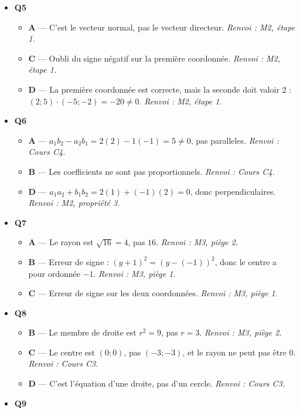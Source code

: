 \begin{itemize}
\begin{itemize}
  \end{itemize}
  \item \textbf{Q5}
  \begin{itemize}
    \item \textbf{A} — C'est le vecteur normal, pas le vecteur directeur. \emph{Renvoi : M2, étape 1.}
    \item \textbf{C} — Oubli du signe négatif sur la première coordonnée. \emph{Renvoi : M2, étape 1.}
    \item \textbf{D} — La première coordonnée est correcte, mais la seconde doit valoir $2$ : $(2;5)\cdot(-5;-2)=-20\neq0$. \emph{Renvoi : M2, étape 1.}
  \end{itemize}
  \item \textbf{Q6}
  \begin{itemize}
    \item \textbf{A} — $a_1 b_2 - a_2 b_1 = 2(2) - 1(-1) = 5 \neq 0$, pas paralleles. \emph{Renvoi : Cours C4.}
    \item \textbf{B} — Les coefficients ne sont pas proportionnels. \emph{Renvoi : Cours C4.}
    \item \textbf{D} — $a_1 a_2 + b_1 b_2 = 2(1) + (-1)(2) = 0$, donc perpendiculaires. \emph{Renvoi : M2, propriété 3.}
  \end{itemize}
  \item \textbf{Q7}
  \begin{itemize}
    \item \textbf{A} — Le rayon est $\sqrt{16} = 4$, pas $16$. \emph{Renvoi : M3, piège 2.}
    \item \textbf{B} — Erreur de signe : $(y + 1)^2 = (y - (-1))^2$, donc le centre a pour ordonnée $-1$. \emph{Renvoi : M3, piège 1.}
    \item \textbf{C} — Erreur de signe sur les deux coordonnées. \emph{Renvoi : M3, piège 1.}
  \end{itemize}
  \item \textbf{Q8}
  \begin{itemize}
    \item \textbf{B} — Le membre de droite est $r^2 = 9$, pas $r = 3$. \emph{Renvoi : M3, piège 2.}
    \item \textbf{C} — Le centre est $(0;0)$, pas $(-3;-3)$, et le rayon ne peut pas être $0$. \emph{Renvoi : Cours C3.}
    \item \textbf{D} — C'est l'équation d'une droite, pas d'un cercle. \emph{Renvoi : Cours C3.}
  \end{itemize}
  \item \textbf{Q9}

\end{itemize}
